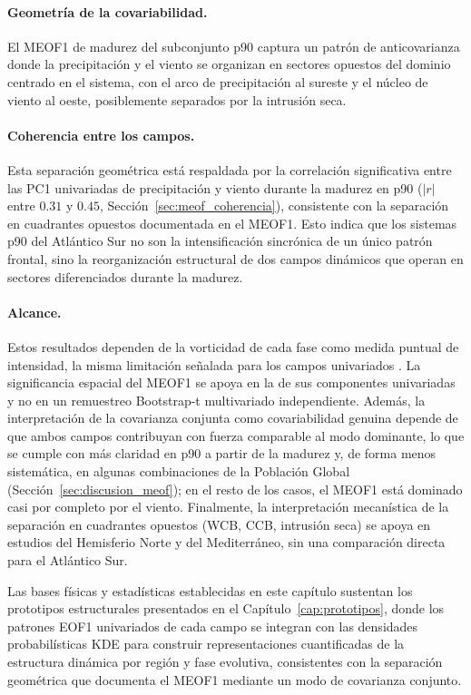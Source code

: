 \paragraph{Geometría de la covariabilidad.}
El MEOF1 de madurez del subconjunto p90 captura un patrón de anticovarianza donde la precipitación y el viento se organizan en sectores opuestos del dominio centrado en el sistema, con el arco de precipitación al sureste y el núcleo de viento al oeste, posiblemente separados por la intrusión seca.

\paragraph{Coherencia entre los campos.}
Esta separación geométrica está respaldada por la correlación significativa entre las PC1 univariadas de precipitación y viento durante la madurez en p90 ($|r|$ entre $0.31$ y $0.45$, Sección~\ref{sec:meof_coherencia}), consistente con la separación en cuadrantes opuestos documentada en el MEOF1. Esto indica que los sistemas p90 del Atlántico Sur no son la intensificación sincrónica de un único patrón frontal, sino la reorganización estructural de dos campos dinámicos que operan en sectores diferenciados durante la madurez.

\paragraph{Alcance.}
Estos resultados dependen de la vorticidad de cada fase como medida puntual de intensidad, la misma limitación señalada para los campos univariados \citep{sinclair1997objective}. La significancia espacial del MEOF1 se apoya en la de sus componentes univariadas y no en un remuestreo Bootstrap-t multivariado independiente. Además, la interpretación de la covarianza conjunta como covariabilidad genuina depende de que ambos campos contribuyan con fuerza comparable al modo dominante, lo que se cumple con más claridad en p90 a partir de la madurez y, de forma menos sistemática, en algunas combinaciones de la Población Global (Sección~\ref{sec:discusion_meof}); en el resto de los casos, el MEOF1 está dominado casi por completo por el viento. Finalmente, la interpretación mecanística de la separación en cuadrantes opuestos (WCB, CCB, intrusión seca) se apoya en estudios del Hemisferio Norte y del Mediterráneo, sin una comparación directa para el Atlántico Sur.

Las bases físicas y estadísticas establecidas en este capítulo sustentan los prototipos estructurales presentados en el Capítulo~\ref{cap:prototipos}, donde los patrones EOF1 univariados de cada campo se integran con las densidades probabilísticas KDE para construir representaciones cuantificadas de la estructura dinámica por región y fase evolutiva, consistentes con la separación geométrica que documenta el MEOF1 mediante un modo de covarianza conjunto.
